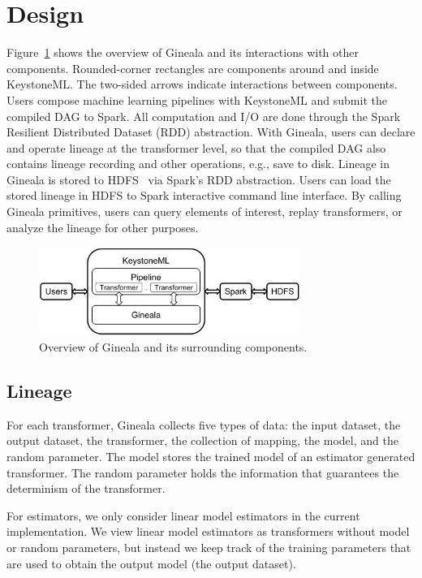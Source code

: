 \documentclass{sig-alternate}
\begin{document}
\section{Design}
\label{sec:Design}
Figure~\ref{fig:architecture} shows the overview of Gineala and its interactions with other components. 
Rounded-corner rectangles are components around and inside KeystoneML. 
The two-sided arrows indicate interactions between components.
Users compose machine learning pipelines with KeystoneML and submit the compiled DAG to Spark.
All computation and I/O are done through the Spark Resilient Distributed Dataset (RDD) abstraction.
With Gineala, users can declare and operate lineage at the transformer level, 
so that the compiled DAG also contains lineage recording and other operations, e.g., save to disk.
Lineage in Gineala is stored to HDFS~\cite{shvachko10} via Spark's RDD abstraction.
Users can load the stored lineage in HDFS to Spark interactive command line interface.
By calling Gineala primitives, users can query elements of interest, replay transformers, or analyze
the lineage for other purposes.

\begin{figure}[h]
\begin{center}
    \includegraphics[width=85mm]{pictures/architecture}
\caption {Overview of Gineala and its surrounding components.
    \label{fig:architecture}
}
\end{center}
\end{figure}

\subsection{Lineage}
\label{sec:Design-Lineage}
For each transformer, Gineala collects five types of data: the input dataset, the output dataset, the transformer, the collection of mapping, the model, and the random parameter.
The model stores the trained model of an estimator generated transformer.
The random parameter holds the information that guarantees the determinism of the transformer.

For estimators, we only consider linear model estimators in the current implementation. 
We view linear model estimators as transformers without model or random parameters, 
but instead we keep track of the training parameters that are used to obtain the output model (the output dataset). 
\end{document}
